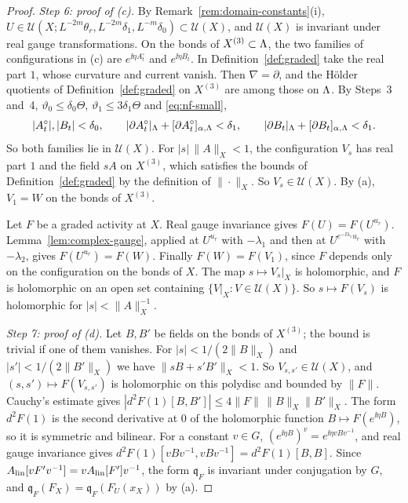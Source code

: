 \begin{proof}
\emph{Step 6: proof of (c).} By Remark~\ref{rem:domain-constants}(i), $U\in\mathcal U(X;L^{-2m}\theta_r,L^{-2m}\delta_1,L^{-m}\delta_0)\subset\mathcal U(X)$, and $\mathcal U(X)$ is invariant under real gauge transformations. On the bonds of $X^{(3)}\subset\Lambda$, the two families of configurations in (c) are $e^{\ii\eta A^\circ_t}$ and $e^{\ii\eta B_t}$. In Definition~\ref{def:graded} take the real part $1$, whose curvature and current vanish. Then $\nabla=\partial$, and the H\"older quotients of Definition~\ref{def:graded} on $X^{(3)}$ are among those on $\Lambda$. By Steps~3 and~4, $\vartheta_0\le\delta_0\Theta$, $\vartheta_1\le3\delta_1\Theta$ and \eqref{eq:nf-small},
\[
|A^\circ_t|,|B_t|<\delta_0,\qquad|\partial A^\circ_t|_\Lambda+[\partial A^\circ_t]_{\alpha,\Lambda}<\delta_1,\qquad|\partial B_t|_\Lambda+[\partial B_t]_{\alpha,\Lambda}<\delta_1 .
\]
So both families lie in $\mathcal U(X)$. For $|s|\,\|A\|_X<1$, the configuration $V_s$ has real part $1$ and the field $sA$ on $X^{(3)}$, which satisfies the bounds of Definition~\ref{def:graded} by the definition of $\|\cdot\|_X$. So $V_s\in\mathcal U(X)$. By (a), $V_1=W$ on the bonds of $X^{(3)}$.

Let $F$ be a graded activity at $X$. Real gauge invariance gives $F(U)=F(U^{u_r})$. Lemma~\ref{lem:complex-gauge}, applied at $U^{u_r}$ with $-\lambda_1$ and then at $U^{e^{-\ii\lambda_1}u_r}$ with $-\lambda_2$, gives $F(U^{u_r})=F(W)$. Finally $F(W)=F(V_1)$, since $F$ depends only on the configuration on the bonds of $X$. The map $s\mapsto V_s|_X$ is holomorphic, and $F$ is holomorphic on an open set containing $\{V|_X:V\in\mathcal U(X)\}$. So $s\mapsto F(V_s)$ is holomorphic for $|s|<\|A\|_X^{-1}$.

\emph{Step 7: proof of (d).} Let $B,B'$ be fields on the bonds of $X^{(3)}$; the bound is trivial if one of them vanishes. For $|s|<1/(2\|B\|_X)$ and $|s'|<1/(2\|B'\|_X)$ we have $\|sB+s'B'\|_X<1$. So $V_{s,s'}\in\mathcal U(X)$, and $(s,s')\mapsto F(V_{s,s'})$ is holomorphic on this polydisc and bounded by $\|F\|$. Cauchy's estimate gives $|d^2F(1)[B,B']|\le4\|F\|\,\|B\|_X\|B'\|_X$. The form $d^2F(1)$ is the second derivative at $0$ of the holomorphic function $B\mapsto F(e^{\ii\eta B})$, so it is symmetric and bilinear. For a constant $v\in G$, $(e^{\ii\eta B})^v=e^{\ii\eta vBv^{-1}}$, and real gauge invariance gives $d^2F(1)[vBv^{-1},vBv^{-1}]=d^2F(1)[B,B]$. Since $A_{\rm lin}[vF'v^{-1}]=vA_{\rm lin}[F']v^{-1}$, the form $\mathfrak q_F$ is invariant under conjugation by $G$, and $\mathfrak q_F(F_X)=\mathfrak q_F(F_U(x_X))$ by (a).


\end{proof}
